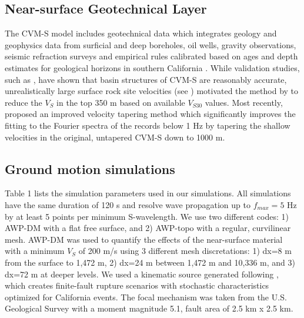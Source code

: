 \subsection{Near-surface Geotechnical Layer}
The CVM-S model includes geotechnical data which integrates geology and geophysics data from surficial and deep boreholes, oil wells, gravity observations, seismic refraction surveys and empirical rules calibrated based on ages and depth estimates for geological horizons in southern California . While validation studies, such as \citet{tabordaEvaluationSouthernCalifornia2016}, have shown that basin structures of CVM-S are reasonably accurate, unrealistically large surface rock site velocities (see ) motivated the method by \citet{elyVs30derivedNearsurfaceSeismic2010} to reduce the $V_S$ in the top 350 m based on available $V_{S30}$ values. Most recently, \citet{huCalibrationNearsurfaceSeismic2021} proposed an improved velocity tapering method  which significantly improves the fitting to the Fourier spectra of the records below 1 Hz by tapering the shallow velocities in the original, untapered CVM-S down to 1000 m.

\subsection{Ground motion simulations}
Table 1 lists the simulation parameters used in our simulations. All simulations have the same duration of 120 s and resolve wave propagation up to $f_{max}=5$ Hz by at least 5 points per minimum S-wavelength. We use two different codes: 1) AWP-DM with a flat free surface, and 2) AWP-topo with a regular, curvilinear mesh. AWP-DM was used to quantify the effects of the near-surface material with a minimum $V_S$ of 200 m/s using 3 different mesh discretations: 1) dx=8 m from the surface to 1,472 m, 2) dx=24 m between 1,472 m and 10,336 m, and 3) dx=72 m at deeper levels. We used a kinematic source generated following \citet{gravesKinematicGroundMotion2016}, which creates finite-fault rupture scenarios with stochastic characteristics optimized for California events. The focal mechanism was taken from the U.S. Geological Survey \citep[strike=233°, dip=77°, rake=49°; ][]{usgsEarthquakeEventsFocal2014} with a moment magnitude 5.1, fault area of 2.5 km x 2.5 km.

